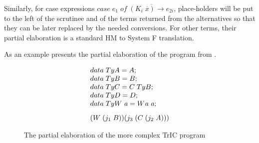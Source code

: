 Similarly, for case expressions $case\;e_1\;of\;\overline{(K_i\;\overline{x})\rightarrow e_{2i}}$, place-holders will be put to the left of the scrutinee and of the terms returned from the alternatives so that they can be later replaced by the needed conversions. For other terms, their partial elaboration is a standard HM to System F translation.

As an example  presents the partial elaboration of the program from .

\begin{figure}
     \[
\begin{array}{@{\hspace{0mm}}l@{\hspace{0mm}}}
  data\;TyA=A;\\
  data\;TyB=B;\\
  data\;TyC=C \; TyB;\\
  data\;TyD=D;\\
  data\;TyW\;\tyVar=W \tyVar \; \tyVar;\\[3mm]
  (W\;(j_1\;B)) (j_3 \; (C\;(j_2\;A)))

\end{array}
\]
\caption{The partial elaboration of the more complex TrIC program}
\label{partialElab}
\end{figure}
